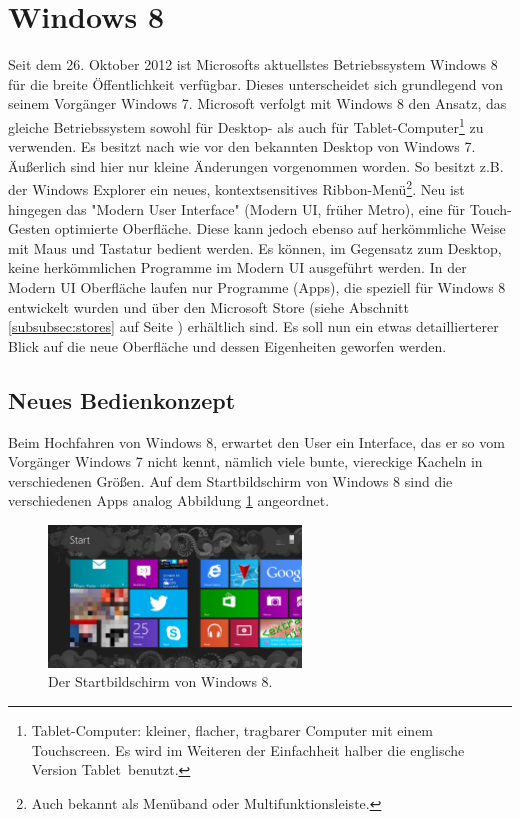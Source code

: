 \documentclass[12pt,a4paper,bibtotoc,abstracton]{scrartcl}
\begin{document}
\section{Windows 8}
\label{sec:windows8}
Seit dem 26. Oktober 2012 ist Microsofts aktuellstes Betriebssystem Windows 8 für die breite Öffentlichkeit verfügbar. Dieses unterscheidet sich grundlegend von seinem Vorgänger Windows 7. Microsoft verfolgt mit Windows 8 den Ansatz, das gleiche Betriebssystem sowohl für Desktop- als auch für Tablet-Computer\footnote{Tablet-Computer: kleiner, flacher, tragbarer Computer mit einem Touchscreen. Es wird im Weiteren der Einfachheit halber die englische Version \glqq Tablet\grqq\ benutzt.} zu verwenden. Es besitzt nach wie vor den bekannten Desktop von Windows 7. Äußerlich sind hier nur kleine Änderungen vorgenommen worden. So besitzt z.B. der Windows Explorer ein neues, kontextsensitives Ribbon-Menü\footnote{Auch bekannt als Menüband oder Multifunktionsleiste.}. Neu ist hingegen das "Modern User Interface" (Modern UI, früher Metro), eine für Touch-Gesten optimierte Oberfläche. Diese kann jedoch ebenso auf herkömmliche Weise mit Maus und Tastatur bedient werden. Es können, im Gegensatz zum Desktop, keine herkömmlichen Programme im Modern UI ausgeführt werden. In der Modern UI Oberfläche laufen nur Programme (Apps), die speziell für Windows 8 entwickelt wurden und über den Microsoft Store (siehe Abschnitt \ref{subsubsec:stores} auf Seite \pageref{subsubsec:stores}) erhältlich sind. Es soll nun ein etwas detaillierterer Blick auf die neue Oberfläche und dessen Eigenheiten geworfen werden.

\subsection{Neues Bedienkonzept}
\label{subsec:bedienkonzept}
Beim Hochfahren von Windows 8, erwartet den User ein Interface, das er so vom Vorgänger Windows 7 nicht kennt, nämlich viele bunte, viereckige Kacheln in verschiedenen Größen. Auf dem Startbildschirm von Windows 8 sind die verschiedenen Apps analog Abbildung \ref{fig:win8startscreen} angeordnet.

\begin{figure}[h]	
	\centering
	\includegraphics[width=0.6\textwidth]{Bilder/Screenshots/windows8/win8_startscreen.png} 
	\caption{Der Startbildschirm von Windows 8.}
	\label{fig:win8startscreen}
\end{figure}
\end{document}
